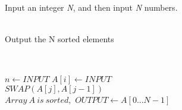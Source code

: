 \documentclass{amsart}
\begin{document}
  \begin{description}
    \large
    \item[INPUT]~\\
    Input an integer \emph{N}, and then input \emph{N} numbers.\\
    \item[OUTPUT]~\\
    Output the N sorted elements\\
 
    \item[Insertion sort Pseudo code]~\\
    \begin{algorithmic}[1]
      \State$n \gets INPUT$
        \State$A[i] \gets INPUT$
      \EndFor
      \\
         
           
            \State$SWAP(A[j], A[j-1])$ 
          \EndIf
        \EndFor
      \EndFor\\
      \State$Array\ A\ is\ sorted,$
      \State$OUTPUT \gets A[0...N-1]$
    \end{algorithmic}
  \end{description}
\end{document}
